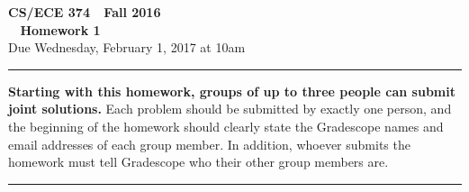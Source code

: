 \documentclass[11pt]{article}
\begin{document}

\thispagestyle{empty}

\begin{center}
\Large\textbf{CS/ECE 374 \,\decosix\,  Fall 2016}%
\\
\LARGE\textbf{\decothreeleft~ Homework 1 ~\decothreeright}%
\\[0.5ex]
\large Due Wednesday, February 1, 2017 at 10am
\end{center}

\bigskip
\hrule
\bigskip

\noindent
\textbf{Starting with this homework, groups of up to three people can submit joint solutions.}  Each problem should be submitted by exactly one person, and the beginning of the homework should clearly state the Gradescope names and email addresses of each group member.  In addition, whoever submits the homework must tell Gradescope who their other group members are.
\bigskip
\hrule
\bigskip
\end{document}
